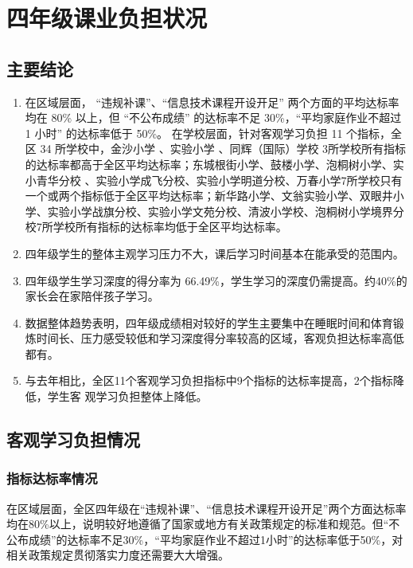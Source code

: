 \documentclass[cn, 11pt, fancy, hide]{elegantbook}
\begin{document}
\hypertarget{section}{%
\chapter{四年级课业负担状况}\label{section}}

\hypertarget{section-1}{%
\section{主要结论}\label{section-1}}

\begin{enumerate}
\def\labelenumi{\arabic{enumi}.}
\item
  在区域层面， ``违规补课''、``信息技术课程开设开足'' 两个方面的平均达标率均在 80\% 以上，但 ``不公布成绩'' 的达标率不足 30\%，``平均家庭作业不超过 1 小时'' 的达标率低于 50\%。 在学校层面，针对客观学习负担 11 个指标，全区 34 所学校中，金沙小学 、实验小学 、同辉（国际）学校 3所学校所有指标的达标率都高于全区平均达标率；东城根街小学、鼓楼小学、泡桐树小学、实小青华分校 、实验小学成飞分校、实验小学明道分校、万春小学7所学校只有一个或两个指标低于全区平均达标率；新华路小学、文翁实验小学、双眼井小学、实验小学战旗分校、实验小学文苑分校、清波小学校、泡桐树小学境界分校7所学校所有指标的达标率均低于全区平均达标率。
\item
  四年级学生的整体主观学习压力不大，课后学习时间基本在能承受的范围内。
\item
  四年级学生学习深度的得分率为 66.49\%，学生学习的深度仍需提高。约40\%的家长会在家陪伴孩子学习。
\item
  数据整体趋势表明，四年级成绩相对较好的学生主要集中在睡眠时间和体育锻炼时间长、压力感受较低和学习深度得分率较高的区域，客观负担达标率高低都有。
\item
  与去年相比，全区11个客观学习负担指标中9个指标的达标率提高，2个指标降低，学生客
  观学习负担整体上降低。
\end{enumerate}

\hypertarget{section-2}{%
\section{客观学习负担情况}\label{section-2}}

\hypertarget{section-3}{%
\subsection{指标达标率情况}\label{section-3}}

在区域层面，全区四年级在``违规补课''、``信息技术课程开设开足''两个方面达标率均在80\%以上，说明较好地遵循了国家或地方有关政策规定的标准和规范。但``不公布成绩''的达标率不足30\%，``平均家庭作业不超过1小时''的达标率低于50\%，对相关政策规定贯彻落实力度还需要大大增强。
\end{document}
